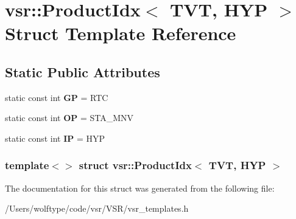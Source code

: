 \hypertarget{structvsr_1_1_product_idx_3_01_t_v_t_00_01_h_y_p_01_4}{\section{vsr\-:\-:Product\-Idx$<$ T\-V\-T, H\-Y\-P $>$ Struct Template Reference}
\label{structvsr_1_1_product_idx_3_01_t_v_t_00_01_h_y_p_01_4}
}
\subsection*{Static Public Attributes}
\begin{DoxyCompactItemize}
\item 
\hypertarget{structvsr_1_1_product_idx_3_01_t_v_t_00_01_h_y_p_01_4_a6b41290628959a594c94674088583624}{static const int {\bfseries G\-P} = R\-T\-C}\label{structvsr_1_1_product_idx_3_01_t_v_t_00_01_h_y_p_01_4_a6b41290628959a594c94674088583624}

\item 
\hypertarget{structvsr_1_1_product_idx_3_01_t_v_t_00_01_h_y_p_01_4_aa06eadbbc67710bfc921f5ab7b8ac713}{static const int {\bfseries O\-P} = S\-T\-A\-\_\-\-M\-N\-V}\label{structvsr_1_1_product_idx_3_01_t_v_t_00_01_h_y_p_01_4_aa06eadbbc67710bfc921f5ab7b8ac713}

\item 
\hypertarget{structvsr_1_1_product_idx_3_01_t_v_t_00_01_h_y_p_01_4_ad7622b2763d65dee92f138551c4faf6c}{static const int {\bfseries I\-P} = H\-Y\-P}\label{structvsr_1_1_product_idx_3_01_t_v_t_00_01_h_y_p_01_4_ad7622b2763d65dee92f138551c4faf6c}

\end{DoxyCompactItemize}
\subsubsection*{template$<$$>$ struct vsr\-::\-Product\-Idx$<$ T\-V\-T, H\-Y\-P $>$}



The documentation for this struct was generated from the following file\-:\begin{DoxyCompactItemize}
\item 
/\-Users/wolftype/code/vsr/\-V\-S\-R/vsr\-\_\-templates.\-h\end{DoxyCompactItemize}
